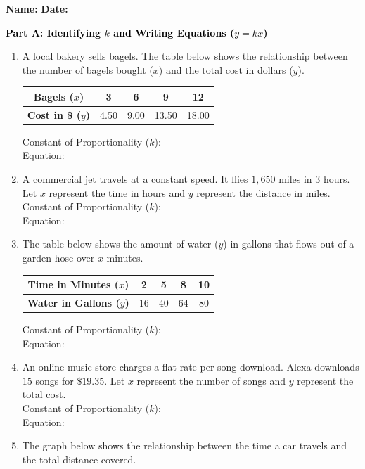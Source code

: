 \documentclass[12pt, letterpaper, fleqn]{article}
\newcommand{\blank}{\underline{\hspace{2.2cm}}}
\newcommand{\blanklong}{\underline{\hspace{6.5cm}}}
\begin{document}
\textbf{Name:} \underline{\hspace{5cm}}
\hfill
\textbf{Date:} \underline{\hspace{3cm}}\\

\begin{tcolorbox}[colback=customteal!20]
\large\textcolor{black}{\textbf{Part A: Identifying $k$ and Writing Equations ($y = kx$)}}
\end{tcolorbox}

\vspace{3mm}

\begin{enumerate}[itemsep=4.2cm, leftmargin=0.6cm]
\item A local bakery sells bagels. The table below shows the relationship between the number of bagels bought ($x$) and the total cost in dollars ($y$).
\begin{center}
\renewcommand{\arraystretch}{1.3}
\begin{tabular}{|c|c|c|c|c|}
\hline
\textbf{Bagels ($x$)} & 3 & 6 & 9 & 12 \\ \hline
\textbf{Cost in \$ ($y$)} & 4.50 & 9.00 & 13.50 & 18.00 \\ \hline
\end{tabular}
\end{center}
Constant of Proportionality ($k$): \blank \\
Equation: \blanklong
\item A commercial jet travels at a constant speed. It flies $1,650$ miles in $3$ hours. Let $x$ represent the time in hours and $y$ represent the distance in miles. \\
Constant of Proportionality ($k$): \blank \\
Equation: \blanklong
\item The table below shows the amount of water ($y$) in gallons that flows out of a garden hose over $x$ minutes.
\begin{center}
\renewcommand{\arraystretch}{1.3}
\begin{tabular}{|c|c|c|c|c|}
\hline
\textbf{Time in Minutes ($x$)} & 2 & 5 & 8 & 10 \\ \hline
\textbf{Water in Gallons ($y$)} & 16 & 40 & 64 & 80 \\ \hline
\end{tabular}
\end{center}
Constant of Proportionality ($k$): \blank \\
Equation: \blanklong
\item An online music store charges a flat rate per song download. Alexa downloads $15$ songs for $\$19.35$. Let $x$ represent the number of songs and $y$ represent the total cost. \\
Constant of Proportionality ($k$): \blank \\
Equation: \blanklong
\item The graph below shows the relationship between the time a car travels and the total distance covered.


\end{enumerate}
\end{document}
